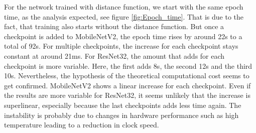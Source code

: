 For the network trained with distance function, we start with the same epoch
time, as the analysis expected, see figure \ref{fig:Epoch_time}. That is due to
the fact, that training also starts without the distance function. But once a
checkpoint is added to MobileNetV2, the epoch time rises by around 22s to a
total of 92s. For multiple checkpoints, the increase for each checkpoint stays
constant at around 21ms. For ResNet32, the amount that adds for each checkpoint
is more variable. Here, the first adds 8s, the second 12s and the third 10s.
Nevertheless, the hypothesis of the theoretical computational cost seems to get
confirmed. MobileNetV2 shows a linear increase for each checkpoint. Even if the
results are more variable for ResNet32, it seems unlikely that the increase is
superlinear, especially because the last checkpoints adds less time again. The
instability is probably due to changes in hardware performance such as high
temperature leading to a reduction in clock speed.


